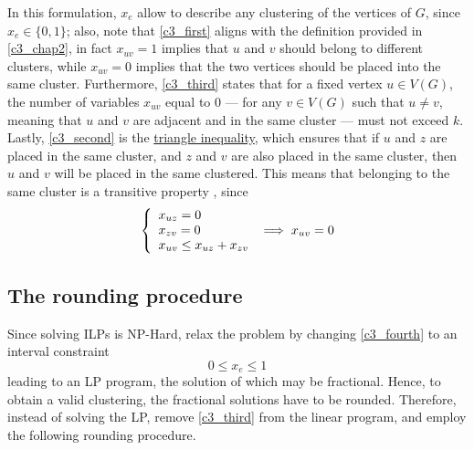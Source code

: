In this formulation, $x_e$ allow to describe any clustering of the vertices of $G$, since $x_e \in \{0, 1\}$; also, note that \cref{c3_first} aligns with the definition provided in \cref{c3_chap2}, in fact $x_{uv} = 1$ implies that $u$ and $v$ should belong to different clusters, while $x_{uv} = 0$ implies that the two vertices should be placed into the same cluster. Furthermore, \cref{c3_third} states that for a fixed vertex $u \in V(G)$, the number of variables $x_{uv}$ equal to 0 --- for any $v \in V(G)$ such that $u \neq v$, meaning that $u$ and $v$ are adjacent and in the same cluster --- must not exceed $k$. Lastly, \cref{c3_second} is the \href{https://en.wikipedia.org/wiki/Triangle_inequality}{triangle inequality}, which ensures that if $u$ and $z$ are placed in the same cluster, and $z$ and $v$ are also placed in the same cluster, then $u$ and $v$ will be placed in the same clustered. This means that belonging to the same cluster is a transitive property , since $$\soe{l}{x_{uz} = 0 \\ x_{zv} = 0 \\ x_{uv} \le x_{uz} + x_{zv}} \implies x_{uv} = 0$$

\subsection{The rounding procedure}

Since solving ILPs is NP-Hard, \textcite{c3} relax the problem by changing \cref{c3_fourth} to an interval constraint $$0 \le x_e \le 1$$ leading to an LP program, the solution of which may be fractional. Hence, to obtain a valid clustering, the fractional solutions have to be rounded. Therefore, instead of solving the LP, \textcite{c3} remove \cref{c3_third} from the linear program, and employ the following rounding procedure.

